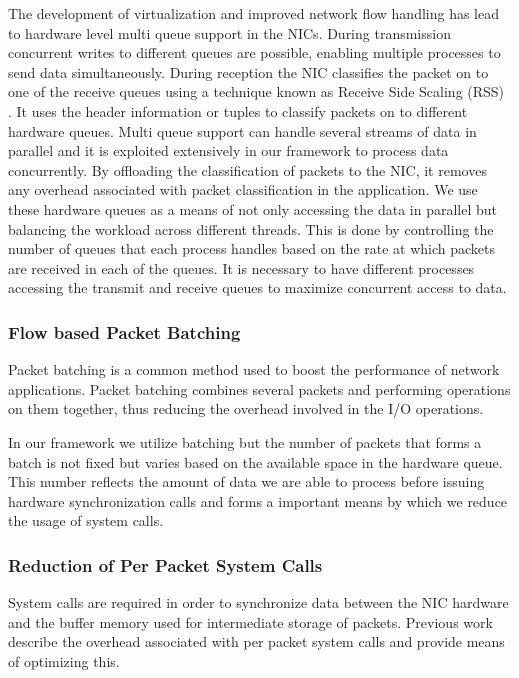 \documentclass[conference]{IEEEtran}
\begin{document}
The development of virtualization and improved network flow handling has lead to hardware level multi queue support in the NICs. During transmission concurrent writes to different queues are possible, enabling multiple processes to send data simultaneously. During reception the NIC classifies the packet on to one of the receive queues using a technique known as Receive Side Scaling (RSS)\cite{micro2008} \cite{intel2010}. It uses the header information or tuples to classify packets on to different hardware queues. Multi queue support can handle several streams of data in parallel and it is exploited extensively in our framework to process data concurrently. By offloading the classification of packets to the NIC, it removes any overhead associated with packet classification in the application. We use these hardware queues as a means of not only accessing the data in parallel but balancing the workload across different threads. This is done by controlling the number of queues that each process handles based on the rate at which packets are received in each of the queues. It is necessary to have different processes accessing the transmit and receive queues to maximize concurrent access to data. 

\subsubsection{Flow based Packet Batching}

Packet batching is a common method used to boost the performance of network applications. Packet batching combines several packets and performing operations on them together, thus reducing the overhead involved in the I/O operations. 

In our framework we utilize batching but the number of packets that forms a batch is not fixed but varies based on the available space in the hardware queue. This number reflects the amount of data we are able to process before issuing hardware synchronization calls and forms a important means by which we reduce the usage of system calls.

\subsubsection{Reduction of Per Packet System Calls} 

System calls are required in order to synchronize data between the NIC hardware and the buffer memory used for intermediate storage of packets. Previous work describe the overhead associated with per packet system calls and provide means of optimizing this\cite{1564468}\cite{Han:2010:PGS:1851275.1851207}\cite{Rizzo:2012:RNI:2090147.2103536}. 
\end{document}
